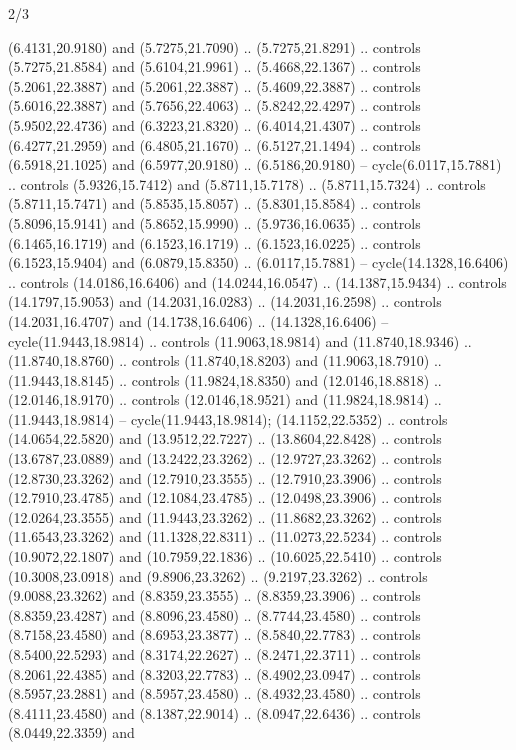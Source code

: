 \begin{flagdescription}{2/3}
\begin{scope}[yshift=\flagwidth,scale=\flagwidth/1241.93737]
\begin{scope}[y=-1mm, x=1mm,draw=gold,fill=blue,line join=miter,miter limit=4,line width=1.8\lw]
{  (6.4131,20.9180) and (5.7275,21.7090) .. (5.7275,21.8291) .. controls
  (5.7275,21.8584) and (5.6104,21.9961) .. (5.4668,22.1367) .. controls
  (5.2061,22.3887) and (5.2061,22.3887) .. (5.4609,22.3887) .. controls
  (5.6016,22.3887) and (5.7656,22.4063) .. (5.8242,22.4297) .. controls
  (5.9502,22.4736) and (6.3223,21.8320) .. (6.4014,21.4307) .. controls
  (6.4277,21.2959) and (6.4805,21.1670) .. (6.5127,21.1494) .. controls
  (6.5918,21.1025) and (6.5977,20.9180) .. (6.5186,20.9180) --
  cycle(6.0117,15.7881) .. controls (5.9326,15.7412) and (5.8711,15.7178) ..
  (5.8711,15.7324) .. controls (5.8711,15.7471) and (5.8535,15.8057) ..
  (5.8301,15.8584) .. controls (5.8096,15.9141) and (5.8652,15.9990) ..
  (5.9736,16.0635) .. controls (6.1465,16.1719) and (6.1523,16.1719) ..
  (6.1523,16.0225) .. controls (6.1523,15.9404) and (6.0879,15.8350) ..
  (6.0117,15.7881) -- cycle(14.1328,16.6406) .. controls (14.0186,16.6406) and
  (14.0244,16.0547) .. (14.1387,15.9434) .. controls (14.1797,15.9053) and
  (14.2031,16.0283) .. (14.2031,16.2598) .. controls (14.2031,16.4707) and
  (14.1738,16.6406) .. (14.1328,16.6406) -- cycle(11.9443,18.9814) .. controls
  (11.9063,18.9814) and (11.8740,18.9346) .. (11.8740,18.8760) .. controls
  (11.8740,18.8203) and (11.9063,18.7910) .. (11.9443,18.8145) .. controls
  (11.9824,18.8350) and (12.0146,18.8818) .. (12.0146,18.9170) .. controls
  (12.0146,18.9521) and (11.9824,18.9814) .. (11.9443,18.9814) --
  cycle(11.9443,18.9814);
 (14.1152,22.5352) .. controls (14.0654,22.5820)
  and (13.9512,22.7227) .. (13.8604,22.8428) .. controls (13.6787,23.0889) and
  (13.2422,23.3262) .. (12.9727,23.3262) .. controls (12.8730,23.3262) and
  (12.7910,23.3555) .. (12.7910,23.3906) .. controls (12.7910,23.4785) and
  (12.1084,23.4785) .. (12.0498,23.3906) .. controls (12.0264,23.3555) and
  (11.9443,23.3262) .. (11.8682,23.3262) .. controls (11.6543,23.3262) and
  (11.1328,22.8311) .. (11.0273,22.5234) .. controls (10.9072,22.1807) and
  (10.7959,22.1836) .. (10.6025,22.5410) .. controls (10.3008,23.0918) and
  (9.8906,23.3262) .. (9.2197,23.3262) .. controls (9.0088,23.3262) and
  (8.8359,23.3555) .. (8.8359,23.3906) .. controls (8.8359,23.4287) and
  (8.8096,23.4580) .. (8.7744,23.4580) .. controls (8.7158,23.4580) and
  (8.6953,23.3877) .. (8.5840,22.7783) .. controls (8.5400,22.5293) and
  (8.3174,22.2627) .. (8.2471,22.3711) .. controls (8.2061,22.4385) and
  (8.3203,22.7783) .. (8.4902,23.0947) .. controls (8.5957,23.2881) and
  (8.5957,23.4580) .. (8.4932,23.4580) .. controls (8.4111,23.4580) and
  (8.1387,22.9014) .. (8.0947,22.6436) .. controls (8.0449,22.3359) and
}
\end{scope}
\end{scope}
\end{flagdescription}
